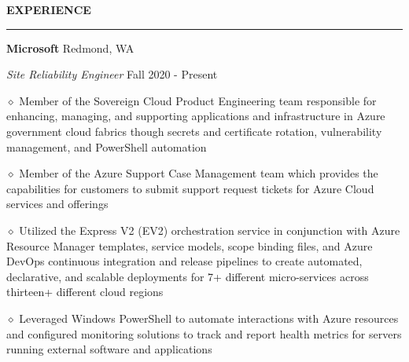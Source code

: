 \documentclass[executivepaper]{extarticle}
\begin{document}
\begin{center}
{\begin{minipage}{7.0in}
{\noindent \textbf{\fontsize{12}{9}\selectfont EXPERIENCE}}

\vspace{-3mm}

\noindent \rule{\textwidth}{0.5pt}

\vspace{0.5mm}

{\noindent \textbf{\fontsize{12}{8}\selectfont Microsoft}} {\hfill \fontsize{10}{8}\selectfont Redmond, WA}

\vspace{0.5mm}

{\noindent \textit{\fontsize{12}{8}\selectfont Site Reliability Engineer}} {\hfill \fontsize{10}{8}\selectfont Fall 2020 - Present}

\vspace{0.5mm}

{\noindent $\diamond$ {\fontsize{12}{8}\selectfont Member of the Sovereign Cloud Product Engineering team responsible for enhancing, managing, and supporting applications and infrastructure in Azure government cloud fabrics though secrets and certificate rotation, vulnerability management, and PowerShell automation}}

\vspace{1mm}

{\noindent $\diamond$ {\fontsize{12}{8}\selectfont Member of the Azure Support Case Management team which provides the capabilities for customers to submit support request tickets for Azure Cloud services and offerings}}

\vspace{1mm}

{\noindent $\diamond$ {\fontsize{12}{8}\selectfont Utilized the Express V2 (EV2) orchestration service in conjunction with Azure Resource Manager templates, service models, scope binding files, and Azure DevOps continuous integration and release pipelines to create automated, declarative, and scalable deployments for 7+ different micro-services across thirteen+ different cloud regions}}

\vspace{1mm}

{\noindent $\diamond$ {\fontsize{12}{8}\selectfont Leveraged Windows PowerShell to automate interactions with Azure resources and configured monitoring solutions to track and report health metrics for servers running external software and applications}}

\vspace{1mm}


\end{minipage}}
\end{center}
\end{document}
